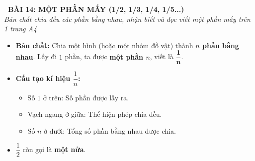 \documentclass[12pt,a4paper]{article}
\begin{document}
\begin{tcolorbox}[
  enhanced,
  colback=teal!8!white,
  colframe=teal!70!black,
  arc=3mm, boxrule=1.2pt,
  left=3mm, right=3mm, top=2mm, bottom=2mm,
  halign=center
]
  {\LARGE\bfseries\color{teal!90!black}\faBookmark\ BÀI 14: MỘT PHẦN MẤY (1/2, 1/3, 1/4, 1/5...)}\\[1mm]
  {\itshape\footnotesize\color{black!75} Bản chất chia đều các phần bằng nhau, nhận biết và đọc viết một phần mấy trên 1 trang A4}
\end{tcolorbox}

\vspace{-2mm}

\noindent
\begin{minipage}[t]{0.49\textwidth}\vspace{0pt}
\begin{tcolorbox}[
  enhanced,
  colback=blue!4!white,
  colframe=blue!75!black,
  arc=2mm, boxrule=0.8pt,
  left=2mm, right=2mm, top=1.8mm, bottom=1.8mm,
  title={\footnotesize\bfseries\color{white}\faCheckSquare\ 1. Khái niệm 'Một phần mấy'}
]
{\footnotesize
\begin{itemize}\setlength{\itemsep}{1pt}\setlength{\leftskip}{-2.5mm}
  \item \textbf{Bản chất:} Chia một hình (hoặc một nhóm đồ vật) thành \textbf{$n$ phần bằng nhau}. Lấy đi $1$ phần, ta được \textbf{một phần $n$}, viết là $\mathbf{\dfrac{1}{n}}$.
  \item \textbf{Cấu tạo kí hiệu $\dfrac{1}{n}$:}
  \begin{itemize}\setlength{\itemsep}{0.5pt}\setlength{\leftskip}{-2.5mm}
    \item Số $1$ ở trên: Số phần được lấy ra.
    \item Vạch ngang ở giữa: Thể hiện phép chia đều.
    \item Số $n$ ở dưới: Tổng số phần bằng nhau được chia.
  \end{itemize}
  \item $\dfrac{1}{2}$ còn gọi là \textbf{một nửa}.
\end{itemize}
}
\end{tcolorbox}
\end{minipage}
\hfill
\end{document}
